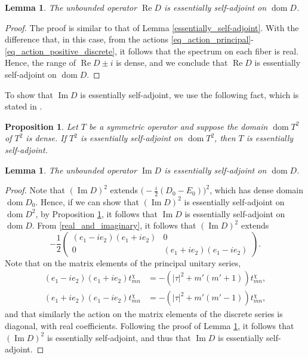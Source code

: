 \documentclass{amsart}
\newtheorem{lemma}[theorem]{Lemma}
\newtheorem{proposition}[theorem]{Proposition}
\theoremstyle{definition}
\theoremstyle{remark}
\DeclareMathOperator{\dom}{dom}
\DeclareMathOperator{\Ree}{Re}
\DeclareMathOperator{\Imm}{Im}
\numberwithin{equation}{section}
\begin{document}
\begin{lemma}\label{real_essentially_self-adjoint}
    The unbounded operator $\Ree D$ is essentially self-adjoint on $\dom D$.
\end{lemma}
\begin{proof}
    The proof is similar to that of Lemma \ref{essentially_self-adjoint}. With the difference that, in this case, from the actions \eqref{eq_action_principal}-\eqref{eq_action_positive_discrete}, it follows that the spectrum on each fiber is real. Hence, the range of $\Ree D\pm i$ is dense, and we conclude that $\Ree D$ is essentially self-adjoint on $\dom D$.
\end{proof}

To show that $\Imm D$ is essentially self-adjoint, we use the following fact, which is stated in \cite[Problem X.28]{reed_simon_vol2}.
\begin{proposition}\label{squared_self_adjoint}
    Let $T$ be a symmetric operator and suppose the domain $\dom T^2$ of $T^2$ is dense. If $T^2$ is essentially self-adjoint on $\dom T^2$, then $T$ is essentially self-adjoint.
\end{proposition}

\begin{lemma}\label{imaginary_essentially_self_adjoint}
    The unbounded operator $\Imm D$ is essentially self-adjoint on $\dom D$.
\end{lemma}
\begin{proof}
    Note that $(\Imm D)^2$ extends $\big(-\tfrac{i}{2}(D_0-E_0)\big)^2$, which has dense domain $\dom D_0$. Hence, if we can show that $(\Imm D)^2$ is essentially self-adjoint on $\dom D^2$, by Proposition \ref{squared_self_adjoint}, it follows that $\Imm D$ is essentially self-adjoint on $\dom D$. From \eqref{real_and_imaginary}, it follows that $(\Imm D)^2$ extends
    \begin{equation*}
        -\frac{1}{2}\begin{pmatrix}
            (e_1-ie_2)(e_1+ie_2) & 0 \\ 0 & (e_1+ie_2)(e_1-ie_2)
        \end{pmatrix}.
    \end{equation*}
    Note that on the matrix elements of the principal unitary series,
    \begin{align*}
        (e_1-ie_2)(e_1+ie_2) t^\chi_{mn}&=-(|\tau|^2+m'(m'+1))t^\chi_{mn},\\
        (e_1+ie_2)(e_1-ie_2)t^\chi_{mn}&=-(|\tau|^2+m'(m'-1))t^\chi_{mn},
    \end{align*}
    and that similarly the action on the matrix elements of the discrete series is diagonal, with real coefficients. Following the proof of Lemma \ref{real_essentially_self-adjoint}, it follows that $(\Imm D)^2$ is essentially self-adjoint, and thus that $\Imm D$ is essentially self-adjoint.
\end{proof}
\end{document}
